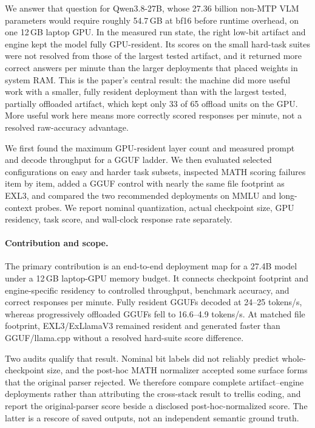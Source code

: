 \documentclass[11pt]{article}
\begin{document}
We answer that question for Qwen3.8-27B, whose 27.36 billion non-MTP VLM
parameters would require roughly 54.7\,GB at bf16 before runtime overhead, on
one 12\,GB laptop GPU. In
the measured run state, the right low-bit artifact and engine kept the model
fully GPU-resident. Its scores on the small hard-task suites were not resolved
from those of the largest tested artifact, and it returned more correct answers
per minute than the larger deployments that placed weights in system RAM. This
is the paper's central result: the machine did more useful work with a smaller,
fully resident deployment than with the largest tested, partially offloaded
artifact, which kept only 33 of 65 offload units on the GPU. More useful work
here means more correctly scored responses per minute, not a resolved
raw-accuracy advantage.

We first found the maximum GPU-resident layer count and measured prompt and
decode throughput for a GGUF ladder. We then evaluated selected configurations
on easy and harder task subsets, inspected MATH scoring failures item by item,
added a GGUF control with nearly the same file footprint as EXL3, and compared
the two recommended deployments on MMLU and long-context probes. We report
nominal quantization, actual checkpoint size, GPU residency, task score, and
wall-clock response rate separately.

\paragraph{Contribution and scope.}
The primary contribution is an end-to-end deployment map for a 27.4B model
under a 12\,GB laptop-GPU memory budget. It connects checkpoint footprint and
engine-specific residency to controlled throughput, benchmark accuracy, and
correct responses per minute. Fully resident GGUFs decoded at 24--25 tokens/s,
whereas progressively offloaded GGUFs fell to 16.6--4.9 tokens/s. At matched
file footprint, EXL3/ExLlamaV3 remained resident and generated faster than
GGUF/llama.cpp without a resolved hard-suite score difference.

Two audits qualify that result. Nominal bit labels did not reliably predict
whole-checkpoint size, and the post-hoc MATH normalizer accepted some surface
forms that the original parser rejected. We therefore compare complete artifact--engine
deployments rather than attributing the cross-stack result to trellis coding,
and report the original-parser score beside a disclosed post-hoc-normalized
score. The latter is a rescore of saved outputs, not an independent semantic
ground truth.
\end{document}
